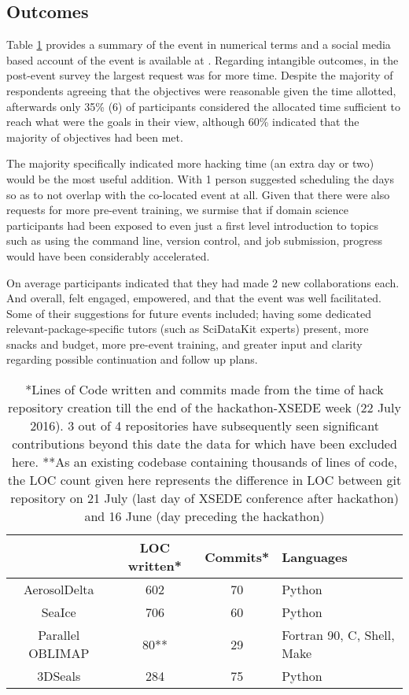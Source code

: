 \documentclass[conference]{IEEEtran}
\begin{document}
\subsection{Outcomes}
Table \ref{stats} provides a summary of the event in numerical terms and a social media based account of the event is available at \cite{noauthor_undated-az}.  Regarding intangible outcomes, in the post-event survey the largest request was for more time.  Despite the majority of respondents agreeing that the objectives were reasonable given the time allotted, afterwards only 35\% (6) of participants considered the allocated time sufficient to reach what were the goals in their view, although 60\% indicated that the majority of objectives had been met.  

The majority specifically indicated more hacking time (an extra day or two) would be the most useful addition.  With 1 person suggested scheduling the days so as to not overlap with the co-located event at all.  Given that there were also requests for more pre-event training, we surmise that if domain science participants had been exposed to even just a first level introduction to topics such as using the command line, version control, and job submission, progress would have been considerably accelerated.

On average participants indicated that they had made 2 new collaborations each.  And overall,  felt engaged, empowered, and that the event was well facilitated.  Some of their suggestions for future events included; having some dedicated relevant-package-specific tutors (such as SciDataKit experts) present, more snacks and budget, more pre-event training, and greater input and clarity regarding possible continuation and follow up plans.


\begin{table}[!t]
\centering
\renewcommand{\arraystretch}{1.3}

\caption{*Lines of Code written and commits made from the time of hack repository creation till the end of the hackathon-XSEDE week (22 July 2016).  3 out of 4 repositories have subsequently seen significant contributions beyond this date the data for which have been excluded here.
**As an existing codebase containing thousands of lines of code, the LOC count given here represents the difference in LOC between git repository on 21 July (last day of XSEDE conference after hackathon) and 16 June (day preceding the hackathon)}
\label{stats}
\centering
\begin{tabular}{|c|c|c|p{2cm}|}
\hline
&LOC written* & Commits* & Languages\\
\hline
AerosolDelta & 602 & 70 & Python\\
\hline
SeaIce & 706 & 60 & Python\\
\hline
Parallel OBLIMAP & 80** & 29 & Fortran 90, C, Shell, Make\\
\hline
3DSeals & 284 & 75 & Python\\
\hline
\end{tabular}
\end{table}
\end{document}
